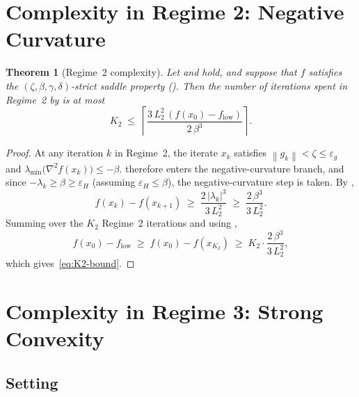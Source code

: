 \documentclass[11pt,a4paper]{article}
\theoremstyle{plain}
\newtheorem{theorem}{Theorem}
\theoremstyle{definition}
\newcommand{\norm}[1]{\left\|#1\right\|}
\newcommand{\eps}{\varepsilon}
\newcommand{\epsg}{\eps_{g}}
\newcommand{\epsH}{\eps_{H}}
\newcommand{\hess}{\nabla^{2}}
\newcommand{\flow}{f_{\mathrm{low}}}
\newcommand{\Ltwo}{L_{2}}
\begin{document}
\section{Complexity in Regime 2: Negative Curvature}\label{sec:regime2}

\begin{theorem}[Regime~2 complexity]\label{thm:regime2}
Let  and  hold, and suppose that $f$ satisfies the $(\zeta, \beta, \gamma, \delta)$-strict saddle property (). Then the number of iterations spent in Regime~2 by  is at most
\begin{equation}\label{eq:K2-bound}
K_{2} \;\leq\; \left\lceil \frac{3\,\Ltwo^{2}\,(f(x_{0}) - \flow)}{2\,\beta^{3}} \right\rceil.
\end{equation}
\end{theorem}

\begin{proof}
At any iteration $k$ in Regime~2, the iterate $x_{k}$ satisfies $\norm{g_{k}} < \zeta \leq \epsg$ and $\lambda_{\min}\!\bigl(\hess f(x_{k})\bigr) \leq -\beta$.  therefore enters the negative-curvature branch, and since $-\lambda_{k} \geq \beta \geq \epsH$ (assuming $\epsH \leq \beta$), the negative-curvature step is taken. By ,
\begin{equation*}
f(x_{k}) - f(x_{k+1}) \;\geq\; \frac{2\,|\lambda_{k}|^{3}}{3\,\Ltwo^{2}} \;\geq\; \frac{2\,\beta^{3}}{3\,\Ltwo^{2}}.
\end{equation*}
Summing over the $K_{2}$ Regime~2 iterations and using ,
\begin{equation*}
f(x_{0}) - \flow \;\geq\; f(x_{0}) - f(x_{K_{2}}) \;\geq\; K_{2}\cdot\frac{2\,\beta^{3}}{3\,\Ltwo^{2}},
\end{equation*}
which gives~\eqref{eq:K2-bound}.
\end{proof}
\section{Complexity in Regime 3: Strong Convexity}\label{sec:regime3}

\subsection{Setting}\label{subsec:r3-setting}
\end{document}
